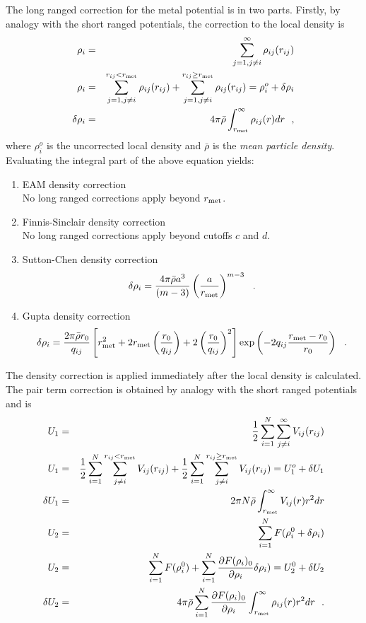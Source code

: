 The long ranged correction
for the \D{} metal potential is in two parts.  Firstly, by analogy
with the short ranged potentials, the correction to the
local density is
\begin{eqnarray}
\rho_{i} &=& \sum_{j=1, j \ne i}^{\infty} \rho_{ij}(r_{ij}) \nonumber \\
\rho_{i} &=& \sum_{j=1, j \ne i}^{r_{ij}<r_{\rm met}} \rho_{ij}(r_{ij}) +
\sum_{j=1, j \ne i}^{r_{ij} \ge r_{\rm met}} \rho_{ij}(r_{ij}) =
\rho_{i}^{o} + \delta \rho_{i} \\
\delta \rho_{i} &=& 4 \pi \bar{\rho} \int_{r_{\rm met}}^{\infty} \rho_{ij}(r) dr~~,
\end{eqnarray}
where $\rho_{i}^{o}$ is the uncorrected local density and
$\bar{\rho}$ is the {\em mean particle density}.  Evaluating the
integral part of the above equation yields:
\begin{enumerate}
\item EAM density correction \\
No long ranged corrections apply beyond $r_{\rm met}$.
\item Finnis-Sinclair density correction \\
No long ranged corrections apply beyond cutoffs $c$ and $d$.
\item Sutton-Chen density correction
\begin{eqnarray}
\delta \rho_{i} = \frac{4 \pi \bar{\rho} a^{3}}{(m-3)}
\left( \frac{a}{r_{\rm met}} \right)^{m-3}~~.
\end{eqnarray}
\item Gupta density correction
\begin{eqnarray}
\delta \rho_{i} = \frac{2 \pi \bar{\rho} r_{0}}{q_{ij}}
\left[ r_{\rm met}^{2} + 2 r_{\rm met} \left(\frac{r_{0}}{q_{ij}}\right) +
2 \left(\frac{r_{0}}{q_{ij}}\right)^{2} \right]
\exp \left( -2 q_{ij} \frac{r_{\rm met}-r_{0}}{r_{0}}\right)~~.
\end{eqnarray}
\end{enumerate}
The density correction is applied immediately after the local
density is calculated.  The pair term correction is obtained by
analogy with the short ranged potentials and is
\begin{eqnarray}
U_{1} &=& {1 \over 2} \sum_{i=1}^{N} \sum_{j \ne i}^{\infty} V_{ij}(r_{ij}) \nonumber \\
U_{1} &=& {1 \over 2} \sum_{i=1}^{N} \sum_{j \ne i}^{r_{ij}<r_{\rm met}} V_{ij}(r_{ij}) +
{1 \over 2} \sum_{i=1}^{N} \sum_{j \ne i}^{r_{ij} \ge r_{\rm met}} V_{ij}(r_{ij}) =
U_{1}^{o} + \delta U_{1} \nonumber \\
\delta U_{1} &=& 2 \pi N \bar{\rho} \int_{r_{\rm met}}^{\infty} V_{ij}(r) r^{2} dr \nonumber \\
U_{2} &=& \sum_{i=1}^{N} F(\rho_{i}^{0} + \delta \rho_{i}) \\
U_{2} &=& \sum_{i=1}^{N} F(\rho_{i}^{0}) +
\sum_{i=1}^{N} \frac{\partial F(\rho_{i})_{0}}{\partial \rho_{i}} \delta \rho_{i}) =
U_{2}^{0} + \delta U_{2} \nonumber \\
\delta U_{2} &=& 4 \pi \bar{\rho} \sum_{i=1}^{N} \frac{\partial F(\rho_{i})_{0}}{\partial \rho_{i}}
\int_{r_{\rm met}}^{\infty} \rho_{ij}(r) r^{2} dr~~. \nonumber
\end{eqnarray}
